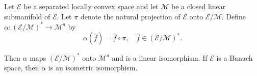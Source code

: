 Let $\mathcal{E}$ be a separated locally convex space and let $\mathcal{M}$ be a closed linear submanifold of $\mathcal{E}$. Let $\pi$ denote the natural projection of $\mathcal{E}$ onto $\mathcal{E}/\mathcal{M}$. Define $\alpha: (\mathcal{E}/\mathcal{M})^* \to \mathcal{M}^a$ by
$$\alpha(\hat{f}) = \hat{f} \circ \pi, \quad \hat{f} \in (\mathcal{E}/\mathcal{M})^*.$$

Then $\alpha$ maps $(\mathcal{E}/\mathcal{M})^*$ onto $\mathcal{M}^a$ and is a linear isomorphism. If $\mathcal{E}$ is a Banach space, then $\alpha$ is an isometric isomorphism.
